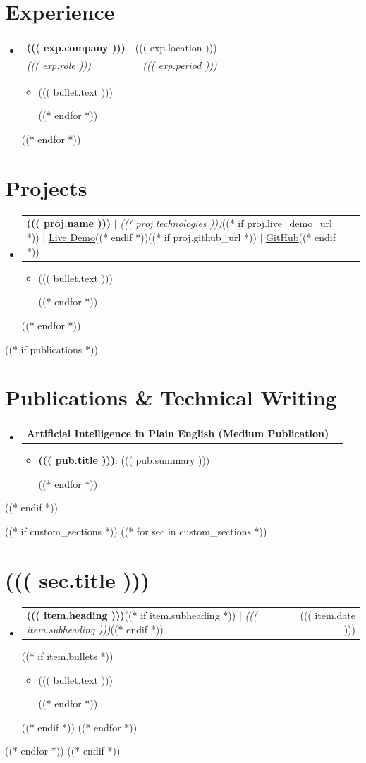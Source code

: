 \documentclass[letterpaper,11pt]{article}
\makeatletter
\newcommand{\resumeItem}[1]{
  \item\small{
    {#1 \vspace{-2pt}}
  }
}
\newcommand{\resumeSubheading}[4]{
  \vspace{-2pt}\item
    \begin{tabular*}{0.97\textwidth}[t]{l@{\extracolsep{\fill}}r}
      \textbf{#1} & #2 \\
      \textit{\small#3} & \textit{\small #4} \\
    \end{tabular*}\vspace{-7pt}
}
\newcommand{\resumeProjectHeading}[2]{
    \item
    \begin{tabular*}{0.97\textwidth}{l@{\extracolsep{\fill}}r}
      \small#1 & #2 \\
    \end{tabular*}\vspace{-7pt}
}
\newcommand{\resumeSubHeadingListStart}{\begin{itemize}[leftmargin=0.15in, label={}]}
\newcommand{\resumeSubHeadingListEnd}{\end{itemize}}
\newcommand{\resumeItemListStart}{\begin{itemize}}
\newcommand{\resumeItemListEnd}{\end{itemize}\vspace{-5pt}}
\makeatother
\begin{document}
\section{Experience}
  \resumeSubHeadingListStart
    ((* for exp in experiences *))
    \resumeSubheading
      {((( exp.company )))}{((( exp.location )))}
      {((( exp.role )))}{((( exp.period )))}
      \resumeItemListStart
        ((* for bullet in exp.bullets *))
        \resumeItem{((( bullet.text )))}
        ((* endfor *))
      \resumeItemListEnd
    ((* endfor *))
  \resumeSubHeadingListEnd

\section{Projects}
    \resumeSubHeadingListStart
      ((* for proj in projects *))
      \resumeProjectHeading
          {\textbf{((( proj.name )))} $|$ \emph{((( proj.technologies )))}((* if proj.live_demo_url *)) $|$ \href{((( proj.live_demo_url )))}{\underline{Live Demo}}((* endif *))((* if proj.github_url *)) $|$ \href{((( proj.github_url )))}{\underline{GitHub}}((* endif *))}
          {}
          \resumeItemListStart
            ((* for bullet in proj.bullets *))
            \resumeItem{((( bullet.text )))}
            ((* endfor *))
          \resumeItemListEnd
      ((* endfor *))
    \resumeSubHeadingListEnd

((* if publications *))
\section{Publications \& Technical Writing}
  \resumeSubHeadingListStart
    \resumeProjectHeading
      {\textbf{Artificial Intelligence in Plain English (Medium Publication)}}{}
      \resumeItemListStart
        ((* for pub in publications *))
        \resumeItem{\href{((( pub.url )))}{\textbf{((( pub.title )))}}: ((( pub.summary )))}
        ((* endfor *))
      \resumeItemListEnd
  \resumeSubHeadingListEnd
((* endif *))

((* if custom_sections *))
((* for sec in custom_sections *))
\section{((( sec.title )))}
  \resumeSubHeadingListStart
    ((* for item in sec['items'] *))
    \resumeProjectHeading
      {\textbf{((( item.heading )))}((* if item.subheading *)) $|$ \emph{((( item.subheading )))}((* endif *))}
      {((( item.date )))}
      ((* if item.bullets *))
      \resumeItemListStart
        ((* for bullet in item.bullets *))
        \resumeItem{((( bullet.text )))}
        ((* endfor *))
      \resumeItemListEnd
      ((* endif *))
    ((* endfor *))
  \resumeSubHeadingListEnd
((* endfor *))
((* endif *))

\end{document}

